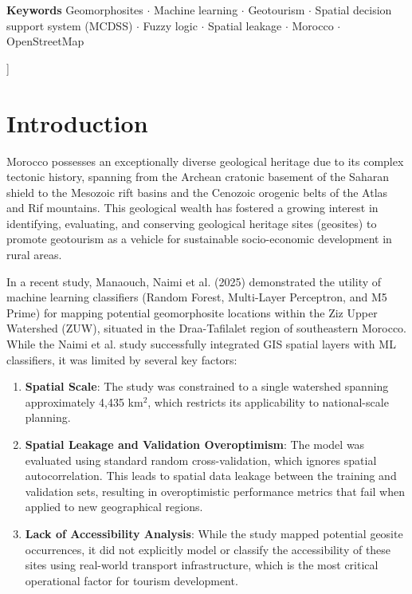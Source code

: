 \documentclass[11pt,twocolumn,a4paper]{article}
\begin{document}
\begin{@twocolumnfalse}
        \noindent\textbf{Keywords} Geomorphosites $\cdot$ Machine learning $\cdot$ Geotourism $\cdot$ Spatial decision support system (MCDSS) $\cdot$ Fuzzy logic $\cdot$ Spatial leakage $\cdot$ Morocco $\cdot$ OpenStreetMap
        \vspace{0.8cm}
    \end{@twocolumnfalse}
]

\section{Introduction}
Morocco possesses an exceptionally diverse geological heritage due to its complex tectonic history, spanning from the Archean cratonic basement of the Saharan shield to the Mesozoic rift basins and the Cenozoic orogenic belts of the Atlas and Rif mountains. This geological wealth has fostered a growing interest in identifying, evaluating, and conserving geological heritage sites (geosites) to promote geotourism as a vehicle for sustainable socio-economic development in rural areas.

In a recent study, Manaouch, Naimi et al. (2025) demonstrated the utility of machine learning classifiers (Random Forest, Multi-Layer Perceptron, and M5 Prime) for mapping potential geomorphosite locations within the Ziz Upper Watershed (ZUW), situated in the Draa-Tafilalet region of southeastern Morocco. While the Naimi et al. study successfully integrated GIS spatial layers with ML classifiers, it was limited by several key factors:
\begin{enumerate}
    \item \textbf{Spatial Scale}: The study was constrained to a single watershed spanning approximately 4,435 km$^2$, which restricts its applicability to national-scale planning.
    \item \textbf{Spatial Leakage and Validation Overoptimism}: The model was evaluated using standard random cross-validation, which ignores spatial autocorrelation. This leads to spatial data leakage between the training and validation sets, resulting in overoptimistic performance metrics that fail when applied to new geographical regions.
    \item \textbf{Lack of Accessibility Analysis}: While the study mapped potential geosite occurrences, it did not explicitly model or classify the accessibility of these sites using real-world transport infrastructure, which is the most critical operational factor for tourism development.
\end{enumerate}
\end{document}
